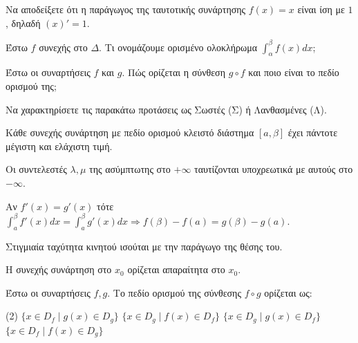 \documentclass[11pt,a4paper]{article}
\newcommand{\kerkissans}[1]{{\fontfamily{maksf}\selectfont \textbf{#1}}}
\renewcommand{\textdexiakeraia}{}
\newcommand{\dint}{\displaystyle\int}
\newcommand\themanum{A}
\newcounter{thema}[section]
\renewcommand{\thethema}{\arabic{thema}}
\newcommand{\Thema}{\refstepcounter{thema}{\textbf{\textcolor{black}{\faPenSquare\ \  \large \kerkissans{\textbf{\thethemaο\hspace{2mm}Διαγώνισμα - Θέμα \themanum}}}}}\hspace{0mm}}{}
\newenvironment{thema}[1]
{\begin{tcolorbox}[title=\Thema\kerkissans{\textbf{\large{  #1}}},breakable,
enhanced standard,titlerule=0pt,toprule=0pt, rightrule=0pt, bottomrule=0pt,
colback=white,left=0mm,top=1mm,bottom=0mm,
boxrule=0pt,
colframe=white,leftrule=0mm,sharp corners,coltitle=black]
\renewcommand{\themanum}{#1}}
{\end{tcolorbox}}
\begin{document}
\begin{thema}{A}
\begin{erwthma}
    \item Να αποδείξετε ότι η παράγωγος της ταυτοτικής συνάρτησης $f(x) = x$ είναι ίση με $1$, δηλαδή $(x)' = 1$.
    \item Έστω $f$ συνεχής στο $\Delta$. Τι ονομάζουμε ορισμένο ολοκλήρωμα $\int_\alpha^\beta f(x) dx$;
    \item Έστω οι συναρτήσεις $f$ και $g$. Πώς ορίζεται η σύνθεση $g \circ f$ και ποιο είναι το πεδίο ορισμού της;
    \item Να χαρακτηρίσετε τις παρακάτω προτάσεις ως Σωστές (Σ) ή Λανθασμένες (Λ).
    \begin{alist}
        \item Κάθε συνεχής συνάρτηση με πεδίο ορισμού κλειστό διάστημα $[a, \beta]$ έχει πάντοτε μέγιστη και ελάχιστη τιμή.
        \item Οι συντελεστές $\lambda, \mu$ της ασύμπτωτης στο $+\infty$ ταυτίζονται υποχρεωτικά με αυτούς στο $-\infty$.
        \item Αν $f'(x) = g'(x)$ τότε $\dint_a^\beta f'(x)dx = \dint_a^\beta g'(x)dx \Rightarrow f(\beta)-f(a) = g(\beta)-g(a)$.
        \item Στιγμιαία ταχύτητα κινητού ισούται με την παράγωγο της θέσης του.
        \item Η συνεχής συνάρτηση στο $x_0$ ορίζεται απαραίτητα στο $x_0$.
    \end{alist}
    \item Έστω οι συναρτήσεις $f, g$. Το πεδίο ορισμού της σύνθεσης $f \circ g$ ορίζεται ως:
    \begin{tasks}[label=\let\textdexiakeraia\relax\alph*.](2)
        \task $\big\{x \in D_f \mid g(x) \in D_g\big\}$
        \task $\big\{x \in D_g \mid f(x) \in D_f\big\}$
        \task $\big\{x \in D_g \mid g(x) \in D_f\big\}$
        \task $\big\{x \in D_f \mid f(x) \in D_g\big\}$
    \end{tasks}
\end{erwthma}
\end{thema}
\vspace{1cm}
\end{document}
